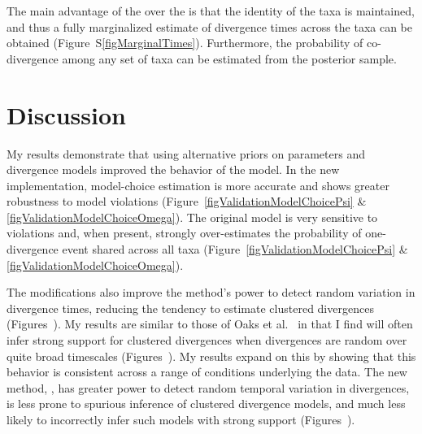 The main advantage of the \npModelDPPOrdered over the \npModelDPP is that the
identity of the taxa is maintained, and thus a fully marginalized estimate of
divergence times across the taxa can be obtained
(Figure~S\ref{figMarginalTimes}).
Furthermore, the probability of co-divergence among any set of taxa can be
estimated from the posterior sample.

\section{Discussion}
My results demonstrate that using alternative priors on parameters and
divergence models improved the behavior of the \msb model.
In the new implementation, model-choice estimation is more accurate and shows
greater robustness to model violations
(Figure~\ref{figValidationModelChoicePsi} \&
\ref{figValidationModelChoiceOmega}).
The original model is very sensitive to violations and, when present,
strongly over-estimates the probability of one-divergence event shared
across all taxa
(Figure~\ref{figValidationModelChoicePsi} \&
\ref{figValidationModelChoiceOmega}).

The modifications also improve the method's power to detect random
variation in divergence times, reducing the tendency to estimate clustered
divergences
(Figures~).
My results are similar to those of Oaks et al.\ \cite{Oaks2012} in that I find
\msb will often infer strong support for clustered divergences when divergences
are random over quite broad timescales
(Figures~).
My results expand on this by showing that this behavior is consistent
across a range of conditions underlying the data.
The new method, \dppmsbayes, has greater power to detect random temporal
variation in divergences, is less prone to spurious inference of clustered
divergence models, and much less likely to incorrectly infer such models with
strong support
(Figures~).

